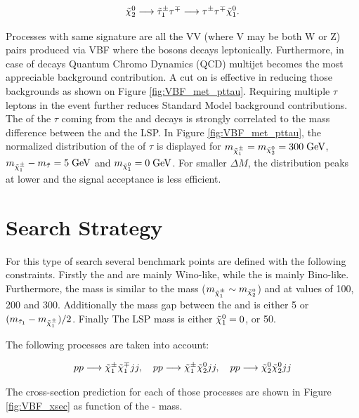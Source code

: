 \begin{equation}
\tilde{\chi}^{0}_{2} \longrightarrow \tilde{\tau}_{1}^{\pm} \tau^{\mp} \longrightarrow \tau^{\pm} \tau^{\mp} \tilde{\chi}^{0}_{1}.
\end{equation}

Processes with same signature are all the VV (where V may be both W or Z) pairs produced via VBF where the bosons decays leptonically. Furthermore, in case of \hadtau decays Quantum Chromo Dynamics (QCD) multijet becomes the most appreciable background contribution. A cut on \met is effective in reducing those backgrounds as shown on Figure \ref{fig:VBF_met_pttau}. Requiring multiple $\tau$ leptons in the event further reduces Standard Model background contributions. The \pt of the \ensuremath{\tau} coming from the \charginopm and \neutralinotwo decays is strongly correlated to the mass difference between the \charginopm and the \neutralinoone LSP. In Figure \ref{fig:VBF_met_pttau}, the normalized distribution of the \pt of \ensuremath{\tau} is displayed for \ensuremath{m_{\charginopm} = m_{\neutralinotwo} = 300\gev}, \ensuremath{m_{\charginopm} - m_{\tilde{\tau}} = 5\gev} and \ensuremath{m_{\neutralinoone} = 0\gev}. For smaller \ensuremath{\Delta M}, the distribution peaks at lower \pt and the signal acceptance is less efficient.

\section {Search Strategy}
\label{section::search_strategy}

For this type of search several benchmark points are defined with the following constraints. Firstly the \charginopm and \neutralinotwo are mainly Wino-like, while the \neutralinoone is mainly Bino-like. Furthermore, the \charginopm mass is similar to the \neutralinotwo mass ($m_{\tilde{\chi}^{\pm}_{1}} \sim m_{\tilde{\chi}^{0}_{2}}$) and at values of 100, 200 and 300\gev. Additionally the mass gap between the \stau and \charginopm is either 5 \gev or $(m_{\tilde{\tau}_{1}} - m_{\tilde{\chi}^{\pm}_{1}})/2$. Finally The LSP mass is either $\tilde{\chi}^{0}_{1} = 0$, or 50\gev.

The following processes are taken into account:

\begin{equation}
pp \longrightarrow \tilde{\chi}^{\pm}_{1} \tilde{\chi}^{\mp}_{1} jj, \quad pp \longrightarrow \tilde{\chi}^{\pm}_{1} \tilde{\chi}^{0}_{2} jj, \quad pp \longrightarrow \tilde{\chi}^{0}_{2} \tilde{\chi}^{0}_{2} jj
\end{equation}

The cross-section prediction for each of those processes are shown in Figure \ref{fig:VBF_xsec} as function of the \charginomp - \neutralinotwo mass.

